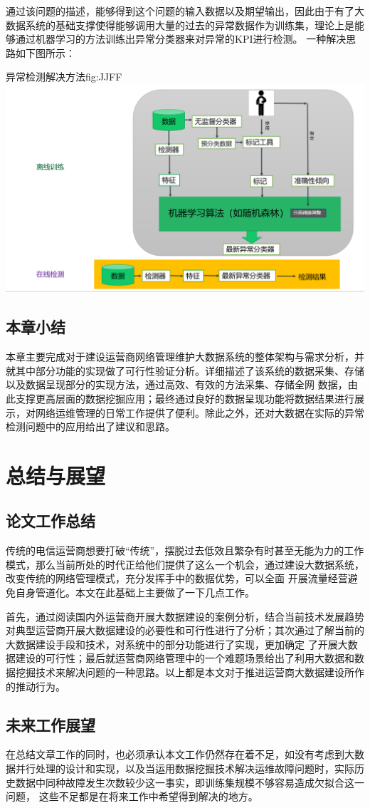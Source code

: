 \documentclass{HustGraduPaper}
\begin{document}
    通过该问题的描述，能够得到这个问题的输入数据以及期望输出，因此由于有了大数据系统的基础支撑使得能够调用大量的过去的异常数据作为训练集，理论上是能够通过机器学习的方法训练出异常分类器来对异常的KPI进行检测。
    一种解决思路如下图所示：

    \begin{generalfig}{异常检测解决方法}{fig:JJFF} 
        \includegraphics[width = \textwidth]{Figures/JJFF.png} 
    \end{generalfig}

    \subsection{本章小结}
    本章主要完成对于建设运营商网络管理维护大数据系统的整体架构与需求分析，并就其中部分功能的实现做了可行性验证分析。详细描述了该系统的数据采集、存储以及数据呈现部分的实现方法，通过高效、有效的方法采集、存储全网
    数据，由此支撑更高层面的数据挖掘应用；最终通过良好的数据呈现功能将数据结果进行展示，对网络运维管理的日常工作提供了便利。除此之外，还对大数据在实际的异常检测问题中的应用给出了建议和思路。
    \section{总结与展望}
    \subsection{论文工作总结}

    传统的电信运营商想要打破“传统”，摆脱过去低效且繁杂有时甚至无能为力的工作模式，那么当前所处的时代正给他们提供了这么一个机会，通过建设大数据系统，改变传统的网络管理模式，充分发挥手中的数据优势，可以全面
    开展流量经营避免自身管道化。本文在此基础上主要做了一下几点工作。

    首先，通过阅读国内外运营商开展大数据建设的案例分析，结合当前技术发展趋势对典型运营商开展大数据建设的必要性和可行性进行了分析；其次通过了解当前的大数据建设手段和技术，对系统中的部分功能进行了实现，更加确定
    了开展大数据建设的可行性；最后就运营商网络管理中的一个难题场景给出了利用大数据和数据挖掘技术来解决问题的一种思路。以上都是本文对于推进运营商大数据建设所作的推动行为。

    \subsection{未来工作展望}
    在总结文章工作的同时，也必须承认本文工作仍然存在着不足，如没有考虑到大数据并行处理的设计和实现，以及当运用数据挖掘技术解决运维故障问题时，实际历史数据中同种故障发生次数较少这一事实，即训练集规模不够容易造成欠拟合这一问题，
    这些不足都是在将来工作中希望得到解决的地方。
    \begin{thankpage}
		
	\end{thankpage}
    
    
\end{document}
